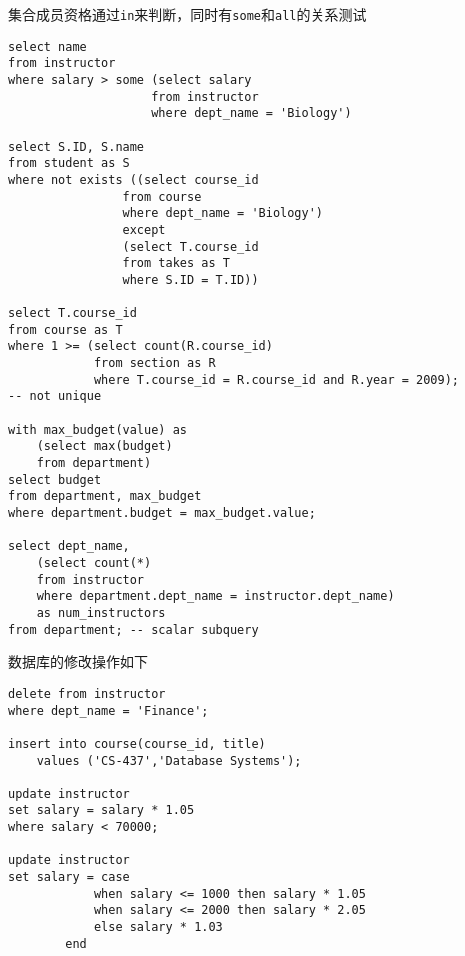 集合成员资格通过\verb'in'来判断，同时有\verb'some'和\verb'all'的关系测试
\begin{lstlisting}
select name
from instructor
where salary > some (select salary
					from instructor
					where dept_name = 'Biology')

select S.ID, S.name
from student as S
where not exists ((select course_id
				from course
				where dept_name = 'Biology')
				except
				(select T.course_id
				from takes as T
				where S.ID = T.ID))

select T.course_id
from course as T
where 1 >= (select count(R.course_id)
			from section as R
			where T.course_id = R.course_id and R.year = 2009);
-- not unique

with max_budget(value) as
	(select max(budget)
	from department)
select budget
from department, max_budget
where department.budget = max_budget.value;

select dept_name,
	(select count(*)
	from instructor
	where department.dept_name = instructor.dept_name)
	as num_instructors
from department; -- scalar subquery
\end{lstlisting}

数据库的修改操作如下
\begin{lstlisting}
delete from instructor
where dept_name = 'Finance';

insert into course(course_id, title)
	values ('CS-437','Database Systems');

update instructor
set salary = salary * 1.05
where salary < 70000;

update instructor
set salary = case
			when salary <= 1000 then salary * 1.05
			when salary <= 2000 then salary * 2.05
			else salary * 1.03
		end
\end{lstlisting}